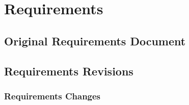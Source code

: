 \documentclass[10pt, onecolumn, draftclsnofoot, letterpaper, compsoc]{IEEEtran}
\begin{document}
\section{Requirements}

\subsection{Original Requirements Document}


\subsection{Requirements Revisions}

\subsubsection{Requirements Changes}
\end{document}
